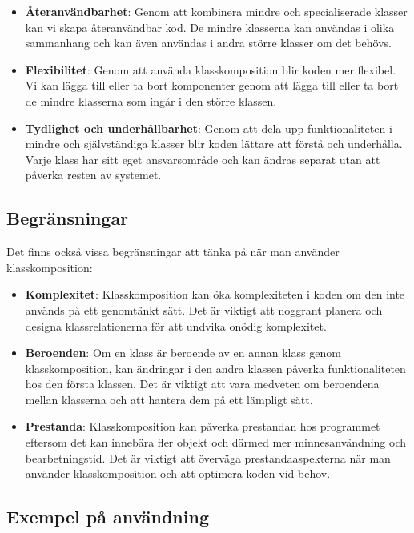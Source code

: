 \begin{itemize}
\item
  \textbf{Återanvändbarhet}: Genom att kombinera mindre och
  specialiserade klasser kan vi skapa återanvändbar kod. De mindre
  klasserna kan användas i olika sammanhang och kan även användas i
  andra större klasser om det behövs.
\item
  \textbf{Flexibilitet}: Genom att använda klasskomposition blir koden
  mer flexibel. Vi kan lägga till eller ta bort komponenter genom att
  lägga till eller ta bort de mindre klasserna som ingår i den större
  klassen.
\item
  \textbf{Tydlighet och underhållbarhet}: Genom att dela upp
  funktionaliteten i mindre och självständiga klasser blir koden lättare
  att förstå och underhålla. Varje klass har sitt eget ansvarsområde och
  kan ändras separat utan att påverka resten av systemet.
\end{itemize}

\hypertarget{begruxe4nsningar}{%
\subsection{Begränsningar}\label{begruxe4nsningar}}

Det finns också vissa begränsningar att tänka på när man använder
klasskomposition:

\begin{itemize}
\item
  \textbf{Komplexitet}: Klasskomposition kan öka komplexiteten i koden
  om den inte används på ett genomtänkt sätt. Det är viktigt att
  noggrant planera och designa klassrelationerna för att undvika onödig
  komplexitet.
\item
  \textbf{Beroenden}: Om en klass är beroende av en annan klass genom
  klasskomposition, kan ändringar i den andra klassen påverka
  funktionaliteten hos den första klassen. Det är viktigt att vara
  medveten om beroendena mellan klasserna och att hantera dem på ett
  lämpligt sätt.
\item
  \textbf{Prestanda}: Klasskomposition kan påverka prestandan hos
  programmet eftersom det kan innebära fler objekt och därmed mer
  minnesanvändning och bearbetningstid. Det är viktigt att överväga
  prestandaaspekterna när man använder klasskomposition och att optimera
  koden vid behov.
\end{itemize}

\hypertarget{exempel-puxe5-anvuxe4ndning}{%
\subsection{Exempel på användning}\label{exempel-puxe5-anvuxe4ndning}}

